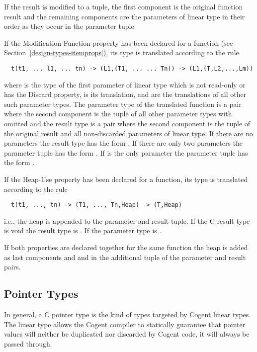 If the result is modified to a tuple, the first component is the original function result and the remaining components
are the parameters of linear type in their order as they occur in the parameter tuple.

If the Modification-Function property has been declared for a function (see Section~\ref{design-types-itemprops}), its 
type is translated according to the rule
\begin{verbatim}
  t(t1, ... l1, ... tn) -> (L1,(T1, ... ... Tn)) -> (L1,(T,L2,...,Lm))
\end{verbatim}
where  is the type of the first parameter of linear type which is not read-only or has the Discard property, 
is its translation, and  are the translations of all other such parameter types. The parameter type of
the translated function is a pair where the second component is the tuple of all other parameter types with 
omitted and the result type is a pair where the second component is the tuple of the original result and all non-discarded
parameters of linear type. If there are no parameters  the result type has the form . If there
are only two parameters the parameter tuple has the form . If  is the only parameter the parameter tuple
has the form .

If the Heap-Use property has been declared for a function, its type is translated according to the rule
\begin{verbatim}
  t(t1, ..., tn) -> (T1, ..., Tn,Heap) -> (T,Heap)
\end{verbatim}
i.e., the heap is appended to the parameter and result tuple. If the C result type is void the result type is .
If  the parameter type is .

If both properties are declared together for the same function the heap is added as last components  and
and  in the additional tuple of the parameter and result pairs.

\subsection{Pointer Types}
\label{design-types-pointer}

In general, a C pointer type  is the kind of types targeted by Cogent linear types. The linear type 
allows the Cogent compiler to statically guarantee that pointer values will neither be duplicated nor 
discarded by Cogent code, it will always be passed through. 

